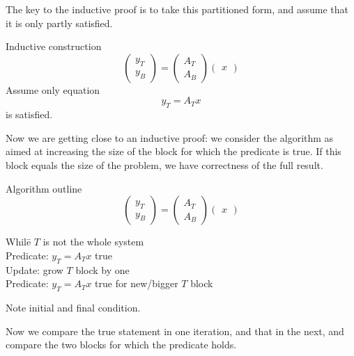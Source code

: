 The key to the inductive proof is
to take this partitioned form, and assume that
it is only partly satisfied.

\begin{block}{Inductive construction}
  \[
  \begin{pmatrix}
    y_T\\ y_B
  \end{pmatrix}
  =
  \begin{pmatrix}
    A_T\\ A_B
  \end{pmatrix}
  \begin{pmatrix}
    x 
  \end{pmatrix}
  \]
Assume only equation
  \[ y_T = A_T x \]
  is satisfied.
\end{block}

Now we are getting close to an inductive proof:
we consider the algorithm as aimed at increasing
the size of the block for which the predicate is true.
If this block equals the size of the problem,
we have correctness of the full result.

\begin{block}{Algorithm outline}
  \[
  \begin{pmatrix}
    y_T\\ y_B
  \end{pmatrix}
  =
  \begin{pmatrix}
    A_T\\ A_B
  \end{pmatrix}
  \begin{pmatrix}
    x 
  \end{pmatrix}
  \]
  \begin{tabbing}
    Whil\=e $T$ is not the whole system\\
    \> Predicate: $y_T = A_T x$ true\\
    \> Update: grow $T$ block by one\\
    \> Predicate: $y_T = A_T x$ true for new/bigger $T$ block\\
  \end{tabbing}
  Note initial and final condition.
\end{block}

Now we compare the true statement in one iteration,
and that in the next, and compare the two blocks
for which the predicate holds.

